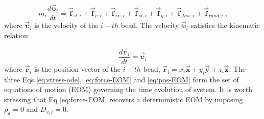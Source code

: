\begin{equation}
m_{i}\frac{d\vec{\boldsymbol{\upsilon}}_{i}}{dt}=\vec{\textbf{f}}_{el,i}+\vec{\textbf{f}}_{c,i}+\vec{\textbf{f}}_{\upsilon e,i}+\vec{\textbf{f}}_{st,i}+\vec{\textbf{f}}_{g,i}+\vec{\textbf{f}}_{diss,i}+\vec{\textbf{f}}_{rand,i}\:\text{,}\label{eq:force-EOM}
\end{equation}
where $\vec{\boldsymbol{\upsilon}}_{i}$ is the velocity of the $i-th$
bead. The velocity $\vec{\boldsymbol{\upsilon}}_{i}$ satisfies the
kinematic relation:

\begin{equation}
\frac{d\vec{\textbf{r}}_{i}}{dt}=\vec{\boldsymbol{\upsilon}}_{i}\label{eq:pos-EOM}
\end{equation}
where $\vec{\textbf{r}}_{i}$ is the position vector of the $i-th$
bead, $\vec{\textbf{r}}_{i}=x_{i}\vec{\textbf{x}}+y_{i}\vec{\textbf{y}}+z_{i}\vec{\textbf{z}}$.
The three Eqs \ref{eq:stress-ode}, \ref{eq:force-EOM} and \ref{eq:pos-EOM}
form the set of equations of motion (EOM) governing the time evolution
of system. It is worth stressing that Eq \ref{eq:force-EOM} recovers
a deterministic EOM by imposing $\rho_{a}=0$ and $D_{\upsilon,i}=0$.

